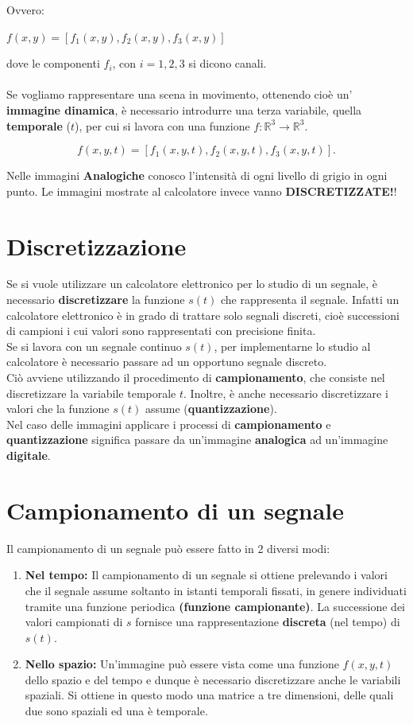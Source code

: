 Ovvero:
\begin{center}
    $f(x,y) = [f_1(x,y), f_2(x,y), f_3(x,y)]$
\end{center}
dove le componenti $f_i$, con $i = 1,2,3$ si dicono canali. \\\\Se vogliamo
rappresentare una scena in movimento, ottenendo cioè un' \textbf{immagine
    dinamica}, è necessario introdurre una terza variabile, quella
\textbf{temporale} ($t$), per cui si lavora con una funzione $f: \mathbb{R}^3
    \rightarrow \mathbb{R}^3$.

$$
    f(x,y,t) = [f_1(x,y,t), f_2(x ,y,t), f_3(x,y,t)].
$$

Nelle immagini \textbf{Analogiche} conosco l'intensità di ogni livello di grigio
in ogni punto. Le immagini mostrate al calcolatore invece vanno
\textbf{DISCRETIZZATE!}!


\section{Discretizzazione}
Se si vuole utilizzare un calcolatore elettronico per lo studio di un segnale, è
necessario \textbf{discretizzare} la funzione $s(t)$ che rappresenta il segnale.
Infatti un calcolatore elettronico è in grado di trattare solo segnali discreti,
cioè successioni di campioni i cui valori sono rappresentati con precisione
finita. \\Se si lavora con un segnale continuo $s(t)$, per implementarne lo
studio al calcolatore è necessario passare ad un opportuno segnale discreto.\\
Ciò avviene utilizzando il procedimento di \textbf{campionamento}, che consiste
nel discretizzare la variabile temporale $t$. Inoltre, è anche necessario
discretizzare i valori che la funzione $s(t)$ assume
(\textbf{quantizzazione}).\\

Nel caso delle immagini applicare i processi di \textbf{campionamento} e
\textbf{quantizzazione} significa passare da un'immagine \textbf{analogica} ad
un'immagine \textbf{digitale}.

\section{Campionamento di un segnale}
Il campionamento di un segnale può essere fatto in 2 diversi modi:
\begin{enumerate}
    \item \textbf{Nel tempo:} Il campionamento di un segnale si ottiene
          prelevando i valori che il segnale assume soltanto in istanti
          temporali fissati, in genere individuati tramite una funzione
          periodica \textbf{(funzione campionante)}. La successione dei valori
          campionati di $s$ fornisce una rappresentazione \textbf{discreta} (nel
          tempo) di $s(t)$.
    \item \textbf{Nello spazio:} Un'immagine può essere vista come una funzione
          $f(x,y,t)$ dello spazio e del tempo e dunque è necessario
          discretizzare anche le variabili spaziali. Si ottiene in questo modo
          una matrice a tre dimensioni, delle quali due sono spaziali ed una è
          temporale.
\end{enumerate}
